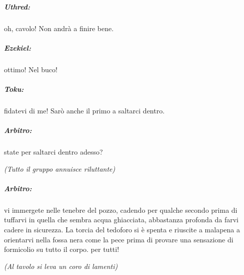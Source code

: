 \documentclass[itdr]{subfiles}
\begin{document}
{\subparagraph{Uthred:} oh, cavolo! Non andrà a finire bene.

\subparagraph{Ezekiel:} ottimo! Nel buco!

\subparagraph{Toku:} fidatevi di me! Sarò anche il primo a saltarci dentro.

\subparagraph{Arbitro:} state per saltarci dentro adesso?

{\em (Tutto il gruppo annuisce riluttante)}

\subparagraph{Arbitro:} vi immergete nelle tenebre del pozzo, cadendo per qualche secondo prima di tuffarvi in quella che sembra acqua ghiacciata, abbastanza profonda da farvi cadere in sicurezza. La torcia del tedoforo si è spenta e riuscite a malapena a orientarvi nella fossa nera come la pece prima di provare una sensazione di formicolio su tutto il corpo.  per tutti!

{\em (Al tavolo si leva un coro di lamenti)}
}
\end{document}
